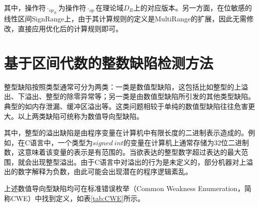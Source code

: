 其中，操作符$ \cdot_{op_R} $为操作符$ \cdot_{op} $在理论域$ D_R $上的对应版本。另一方面，在位敏感的线性区间SignRange上，由于其计算规则的定义是MultiRange的扩展，因此无需修改，直接应用优化后的计算规则即可。


\section{基于区间代数的整数缺陷检测方法}
\label{sec:区间算数缺陷检测方法}

整型缺陷按照类型通常可分为两类：一类是数值型缺陷，这包括比如整型的上溢出、下溢出、整型的除零异常等；另一类是由数值型缺陷所引发的其他类型缺陷。典型的如内存泄漏、缓冲区溢出等。这类问题相较于单纯的数值型缺陷往往危害更大。以上两类缺陷可统称为数值导向型缺陷。

其中，整型的溢出缺陷是由程序变量在计算机中有限长度的二进制表示造成的。例如，在C语言中，一个类型为$ signed ~int $的变量在计算机上通常存储为32位二进制数，这意味着该变量的表示是有范围的。当欲表达的整型数字超过表达的最大范围，就会出现整型溢出。由于C语言中对溢出的行为是未定义的，部分机器对上溢出的数字解释为负数，由此可能会出现潜在的程序逻辑紊乱。

上述数值导向型缺陷均可在标准错误枚举（Common Weakness Enumeration，简称CWE）中找到定义，如表\ref{tab:CWE}所示。



